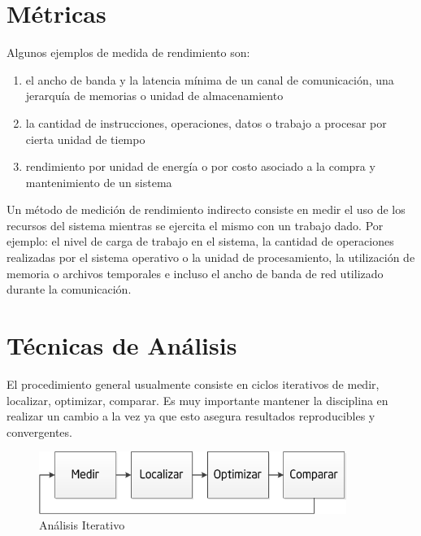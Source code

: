 \documentclass[a4paper]{report}
\begin{document}
\section{M\'etricas}

Algunos ejemplos de medida de rendimiento son:

\begin{enumerate}
\item el ancho de banda y la latencia m\'inima de un canal de comunicaci\'on,
  una jerarqu\'ia de memorias o unidad de almacenamiento
\item la cantidad de instrucciones, operaciones, datos o trabajo a procesar
  por cierta unidad de tiempo
\item rendimiento por unidad de energ\'ia o por costo asociado a la compra y mantenimiento de un sistema
\end{enumerate}

Un m\'etodo de medici\'on de rendimiento indirecto consiste en medir el uso de
los recursos del sistema mientras se ejercita el mismo con un trabajo dado.
Por ejemplo: el nivel de carga de trabajo en el sistema, la cantidad de operaciones realizadas por el
sistema operativo o la unidad de procesamiento, la utilizaci\'on de memoria o
archivos temporales e incluso el ancho de banda de red utilizado durante la comunicaci\'on.

\section{T\'ecnicas de An\'alisis}

El procedimiento general usualmente consiste en ciclos iterativos de medir, localizar, optimizar,
comparar. Es muy importante mantener la disciplina en realizar un cambio a la
vez ya que esto asegura resultados reproducibles y convergentes.

\bigskip

\begin{figure}[H]
\begin{center}
\includegraphics[width=10cm]{cycle.png}
\caption{An\'alisis Iterativo}
\end{center}
\end{figure}

\bigskip
\end{document}
